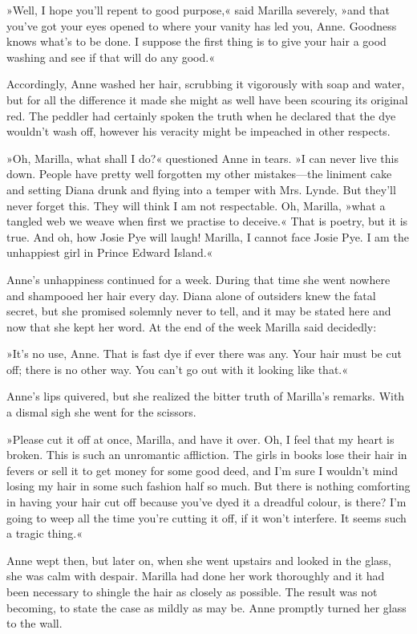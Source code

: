 »Well, I hope you'll repent to good purpose,« said Marilla severely, »and that you've got your eyes opened to where your vanity has led you, Anne. Goodness knows what's to be done. I suppose the first thing is to give your hair a good washing and see if that will do any good.«

Accordingly, Anne washed her hair, scrubbing it vigorously with soap and water, but for all the difference it made she might as well have been scouring its original red. The peddler had certainly spoken the truth when he declared that the dye wouldn't wash off, however his veracity might be impeached in other respects.

»Oh, Marilla, what shall I do?« questioned Anne in tears. »I can never live this down. People have pretty well forgotten my other mistakes—the liniment cake and setting Diana drunk and flying into a temper with Mrs. Lynde. But they'll never forget this. They will think I am not respectable. Oh, Marilla, »what a tangled web we weave when first we practise to deceive.« That is poetry, but it is true. And oh, how Josie Pye will laugh! Marilla, I cannot face Josie Pye. I am the unhappiest girl in Prince Edward Island.«

Anne's unhappiness continued for a week. During that time she went nowhere and shampooed her hair every day. Diana alone of outsiders knew the fatal secret, but she promised solemnly never to tell, and it may be stated here and now that she kept her word. At the end of the week Marilla said decidedly:

»It's no use, Anne. That is fast dye if ever there was any. Your hair must be cut off; there is no other way. You can't go out with it looking like that.«

Anne's lips quivered, but she realized the bitter truth of Marilla's remarks. With a dismal sigh she went for the scissors.

»Please cut it off at once, Marilla, and have it over. Oh, I feel that my heart is broken. This is such an unromantic affliction. The girls in books lose their hair in fevers or sell it to get money for some good deed, and I'm sure I wouldn't mind losing my hair in some such fashion half so much. But there is nothing comforting in having your hair cut off because you've dyed it a dreadful colour, is there? I'm going to weep all the time you're cutting it off, if it won't interfere. It seems such a tragic thing.«

Anne wept then, but later on, when she went upstairs and looked in the glass, she was calm with despair. Marilla had done her work thoroughly and it had been necessary to shingle the hair as closely as possible. The result was not becoming, to state the case as mildly as may be. Anne promptly turned her glass to the wall.

